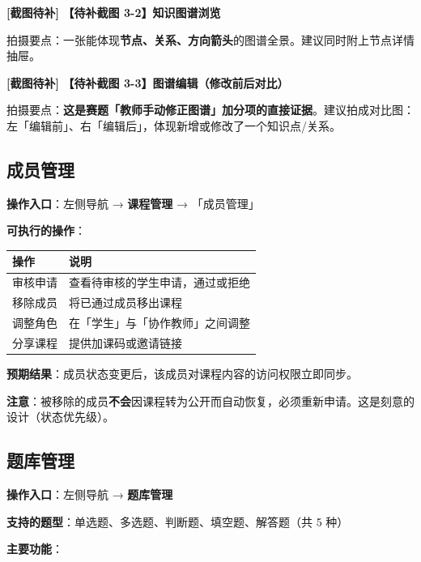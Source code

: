 \documentclass[UTF8,a4paper,11pt]{ctexrep}
\newcommand{\shotmark}{\textcolor{todobar}{\textbf{[截图待补]}}}
\begin{document}
\begin{todobox}
\shotmark{} \textbf{【待补截图 3-2】知识图谱浏览}

拍摄要点：一张能体现\textbf{节点、关系、方向箭头}的图谱全景。建议同时附上节点详情抽屉。

\shotmark{} \textbf{【待补截图 3-3】图谱编辑（修改前后对比）}

拍摄要点：\textbf{这是赛题「教师手动修正图谱」加分项的直接证据}。建议拍成对比图：左「编辑前」、右「编辑后」，体现新增或修改了一个知识点/关系。

\end{todobox}


\subsection{成员管理}

\textbf{操作入口}：左侧导航 → \textbf{课程管理} → 「成员管理」

\textbf{可执行的操作}：

\begin{center}
\small
\begin{tabularx}{\linewidth}{@{}XX@{}}
\toprule
操作 & 说明 \\
\midrule
审核申请 & 查看待审核的学生申请，通过或拒绝 \\
移除成员 & 将已通过成员移出课程 \\
调整角色 & 在「学生」与「协作教师」之间调整 \\
分享课程 & 提供加课码或邀请链接 \\
\bottomrule
\end{tabularx}
\end{center}
\textbf{预期结果}：成员状态变更后，该成员对课程内容的访问权限立即同步。

\begin{notebox}
\textbf{注意}：被移除的成员\textbf{不会}因课程转为公开而自动恢复，必须重新申请。这是刻意的设计（状态优先级）。

\end{notebox}


\subsection{题库管理}

\textbf{操作入口}：左侧导航 → \textbf{题库管理}

\textbf{支持的题型}：单选题、多选题、判断题、填空题、解答题（共 5 种）

\textbf{主要功能}：
\end{document}
